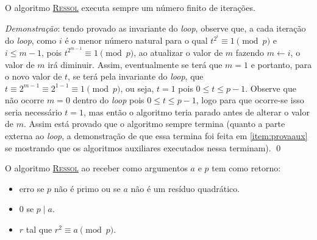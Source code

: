 \begin{enumerate}
    \begin{teorema}
        O algoritmo \hyperref[algo:ressol]{\textsc{Ressol}} executa sempre um número finito de iterações.
    \end{teorema}
    \textit{Demonstração}: tendo provado as invariante do \textit{loop}, observe que, a cada iteração do \textit{loop}, como $i$ é o menor número natural para o qual $t^{2^i} \equiv 1 \pmod{p}$ e $i \leq m - 1$, pois $t^{2^{m-1}} \equiv 1 \pmod{p}$, ao atualizar o valor de $m$ fazendo $m \leftarrow i$, o valor de $m$ irá diminuir. Assim, eventualmente se terá que $m = 1$ e portanto, para o novo valor de $t$, se terá pela invariante do \textit{loop}, que $t \equiv 2^{m - 1} \equiv 2^{1 - 1} \equiv 1 \pmod{p}$, ou seja, $t = 1$ pois $0 \leq t \leq p - 1$. Observe que não ocorre $m = 0$ dentro do \textit{loop} pois $0 \leq t \leq p - 1$, logo para que ocorre-se isso seria necessário $t = 1$, mas então o algoritmo teria parado antes de alterar o valor de $m$. Assim está provado que o algoritmo sempre termina (quanto a parte externa ao \textit{loop}, a demonstração de que essa termina foi feita em \ref{item:provaaux} se mostrando que os algoritmos auxiliares executados nessa terminam). \qed
    
    \begin{teorema}
        O algoritmo \hyperref[algo:ressol]{\textsc{Ressol}} ao receber como argumentos $a$ e $p$ tem como retorno:
        \begin{itemize}
            \item erro se $p$ não é primo ou se $a$ não é um resíduo quadrático.
            \item $0$ se $p \mid a$.
            \item $r$ tal que $r^2 \equiv a \pmod{p}$.
        \end{itemize}
    \end{teorema}
    

\end{enumerate}
